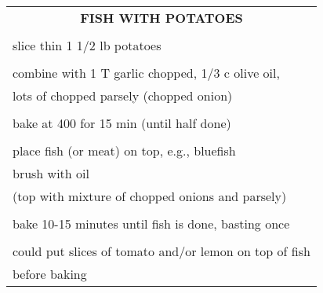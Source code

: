 \documentclass[8pt]{report}
\begin{document}
\centering

\begin{tabular}{|l|} \hline	%
 
\multicolumn{1}{|c|}{\textbf{FISH WITH POTATOES}}
\\
\\

\index{fish/meat!fish with potatoes} \index{fish with potatoes}

slice thin 1 1/2 lb potatoes\\
\\
combine with 1 T garlic chopped, 1/3 c olive oil, \\
lots of chopped parsely (chopped onion)\\
\\
bake at 400 for 15 min (until half done)\\
\\
place fish (or meat) on top, e.g., bluefish\\
brush with oil\\
(top with mixture of chopped onions and parsely)\\
\\
bake 10-15 minutes until fish is done, basting once\\
\\
could put slices of tomato and/or lemon on top of fish\\
before baking\\


\hline

\end{tabular}

\newpage

\centering
\end{document}
